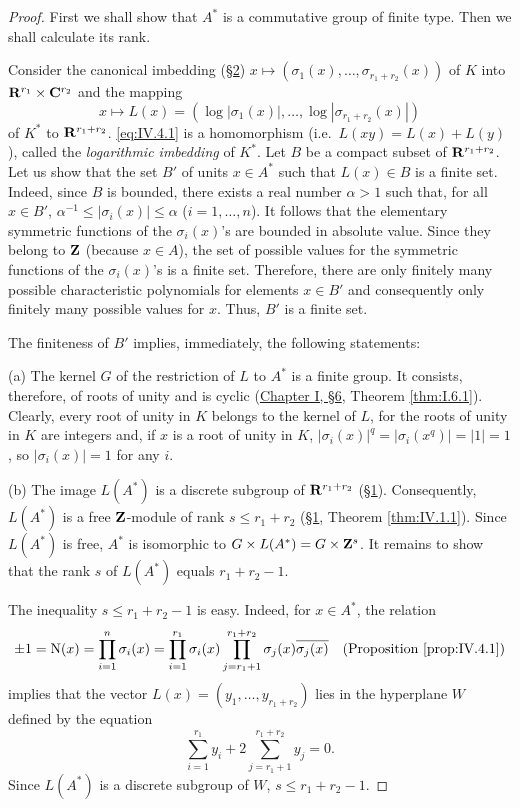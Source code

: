 \begin{proof}
First we shall show that $A^{*}$ is a commutative group of finite type. Then
we shall calculate its rank.

Consider the canonical imbedding (\hyperref[sec:4.2]{§2})
$x\mapsto(\sigma_{1}(x),\ldots,\sigma_{r_{1}+r_{2}}(x))$ of $K$ into
$\mathbf{R}^{r_{1}}\times\mathbf{C}^{r_{2}}$ and the mapping
\begin{equation}
x\mapsto L(x)=(\log|\sigma_{1}(x)|,\ldots,
\log|\sigma_{r_{1}+r_{2}}(x)|)
\label{eq:IV.4.1}
\end{equation}
of $K^{*}$ to $\mathbf{R}^{r_{1}+r_{2}}$. \eqref{eq:IV.4.1} is a homomorphism
(i.e.\ $L(xy)=L(x)+L(y)$), called the \emph{logarithmic imbedding} of
$K^{*}$. Let $B$ be a compact subset of $\mathbf{R}^{r_{1}+r_{2}}$. Let us show that
the set $B'$ of units $x\in A^{*}$ such that $L(x)\in B$ is a finite set.
Indeed, since $B$ is bounded, there exists a real number $\alpha>1$ such
that, for all $x\in B'$, $\alpha^{-1}\leq|\sigma_{i}(x)|\leq\alpha$
($i=1,\ldots,n$). It follows that the elementary symmetric functions of the
$\sigma_{i}(x)$'s are bounded in absolute value. Since they belong to $\mathbf{Z}$
(because $x\in A$), the set of possible values for the symmetric functions
of the $\sigma_{i}(x)$'s is a finite set. Therefore, there are only finitely
many possible characteristic polynomials for elements $x\in B'$ and
consequently only finitely many possible values for $x$. Thus, $B'$ is a
finite set.

The finiteness of $B'$ implies, immediately, the following statements:

(a) The kernel $G$ of the restriction of $L$ to $A^{*}$ is a finite group.
It consists, therefore, of roots of unity and is cyclic (\hyperref[sec:1.6]{Chapter I, §6},
Theorem \ref{thm:I.6.1}). Clearly, every root of unity in $K$ belongs to the
kernel of $L$, for the roots of unity in $K$ are integers and, if $x$ is a
root of unity in $K$,
$|\sigma_{i}(x)|^{q}=|\sigma_{i}(x^{q})|=|1|=1$, so
$|\sigma_{i}(x)|=1$ for any $i$.

(b) The image $L(A^{*})$ is a discrete subgroup of $\mathbf{R}^{r_{1}+r_{2}}$ (\hyperref[sec:4.1]{§1}).
Consequently, $L(A^{*})$ is a free $\mathbf{Z}$-module of rank
$s\leq r_{1}+r_{2}$ (\hyperref[sec:4.1]{§1}, Theorem \ref{thm:IV.1.1}). Since $L(A^{*})$ is
free, $A^{*}$ is isomorphic to $G\times L(A^{*})=G\times\mathbf{Z}^{s}$. It remains
to show that the rank $s$ of $L(A^{*})$ equals $r_{1}+r_{2}-1$.

The inequality $s\leq r_{1}+r_{2}-1$ is easy. Indeed, for $x\in A^{*}$, the
relation
\[
\pm1=\mathrm{N}(x)=\prod_{i=1}^{n}\sigma_{i}(x)
=\prod_{i=1}^{r_{1}}\sigma_{i}(x)
\prod_{j=r_{1}+1}^{r_{1}+r_{2}}\sigma_{j}(x)\overline{\sigma_{j}(x)}
\quad(\text{Proposition \ref{prop:IV.4.1}})
\]
implies that the vector $L(x)=(y_{1},\ldots,y_{r_{1}+r_{2}})$ lies in the
hyperplane $W$ defined by the equation
\begin{equation}
\sum_{i=1}^{r_{1}}y_{i}+2\sum_{j=r_{1}+1}^{r_{1}+r_{2}}y_{j}=0.
\label{eq:IV.4.2}
\end{equation}
Since $L(A^{*})$ is a discrete subgroup of $W$, $s\leq r_{1}+r_{2}-1$.


\end{proof}
